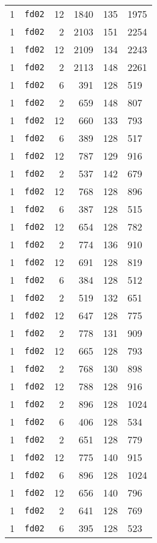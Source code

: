 \documentclass{article}
\begin{document}
\begin{table}[h!]
\begin{tabular}{llrrrl}
    1 & \texttt{fd02} & 12 & 1840 & 135 & 1975 \\
    1 & \texttt{fd02} & 2 & 2103 & 151 & 2254 \\
    1 & \texttt{fd02} & 12 & 2109 & 134 & 2243 \\
    1 & \texttt{fd02} & 2 & 2113 & 148 & 2261 \\
    1 & \texttt{fd02} & 6 & 391 & 128 & 519 \\
    1 & \texttt{fd02} & 2 & 659 & 148 & 807 \\
    1 & \texttt{fd02} & 12 & 660 & 133 & 793 \\
    1 & \texttt{fd02} & 6 & 389 & 128 & 517 \\
    1 & \texttt{fd02} & 12 & 787 & 129 & 916 \\
    1 & \texttt{fd02} & 2 & 537 & 142 & 679 \\
    1 & \texttt{fd02} & 12 & 768 & 128 & 896 \\
    1 & \texttt{fd02} & 6 & 387 & 128 & 515 \\
    1 & \texttt{fd02} & 12 & 654 & 128 & 782 \\
    1 & \texttt{fd02} & 2 & 774 & 136 & 910 \\
    1 & \texttt{fd02} & 12 & 691 & 128 & 819 \\
    1 & \texttt{fd02} & 6 & 384 & 128 & 512 \\
    1 & \texttt{fd02} & 2 & 519 & 132 & 651 \\
    1 & \texttt{fd02} & 12 & 647 & 128 & 775 \\
    1 & \texttt{fd02} & 2 & 778 & 131 & 909 \\
    1 & \texttt{fd02} & 12 & 665 & 128 & 793 \\
    1 & \texttt{fd02} & 2 & 768 & 130 & 898 \\
    1 & \texttt{fd02} & 12 & 788 & 128 & 916 \\
    1 & \texttt{fd02} & 2 & 896 & 128 & 1024 \\
    1 & \texttt{fd02} & 6 & 406 & 128 & 534 \\
    1 & \texttt{fd02} & 2 & 651 & 128 & 779 \\
    1 & \texttt{fd02} & 12 & 775 & 140 & 915 \\
    1 & \texttt{fd02} & 6 & 896 & 128 & 1024 \\
    1 & \texttt{fd02} & 12 & 656 & 140 & 796 \\
    1 & \texttt{fd02} & 2 & 641 & 128 & 769 \\
    1 & \texttt{fd02} & 6 & 395 & 128 & 523 \\

\end{tabular}
\end{table}
\end{document}
